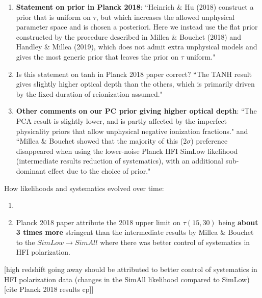 \documentclass[prd,twocolumn,amsmath,amssymb,floatfix,superscriptaddress,nofootinbib]{revtex4-1}
\begin{document}
\begin{enumerate}
    \item {\textbf{Statement on prior in Planck 2018}:  ``Heinrich \& Hu (2018) construct a prior that is uniform on $\tau$, but which increases the allowed unphysical parameter space and is chosen a posteriori. Here we instead use the flat prior constructed by the procedure described in Millea \& Bouchet (2018) and Handley \& Millea (2019), which does not admit extra unphysical models and gives the most generic prior that leaves the prior on $\tau$ uniform."}
    
    \item {Is this statement on tanh in Planck 2018 paper correct?} ``The TANH result gives slightly higher optical depth than the others, which is primarily driven by the fixed duration of reionization assumed." \\
    
    \item{\textbf{Other comments on our PC prior giving higher optical depth}: ``The PCA result is slightly lower, and is partly affected by the imperfect physicality priors that allow unphysical negative ionization fractions." and ``Millea \& Bouchet showed that the majority of this (2$\sigma$) preference disappeared when using the lower-noise Planck HFI SimLow likelihood (intermediate results reduction of systematics), with an additional sub-dominant effect due to the choice of prior."}
    
\end{enumerate}

How likelihoods and systematics evolved over time:

\begin{enumerate}
    \item 
    \item {Planck 2018 paper attribute the 2018 upper limit on $\tau(15, 30)$ being \textbf{about 3 times more} stringent than the intermediate results by Millea \& Bouchet to the $SimLow \rightarrow SimAll$ where there was better control of systematics in HFI polarization.}
\end{enumerate}


[high redshift going away should be attributed to better control of systematics in HFI polarization data (changes in the SimAll likelihood compared to SimLow) [cite Planck 2018 results cp]]
\end{document}
